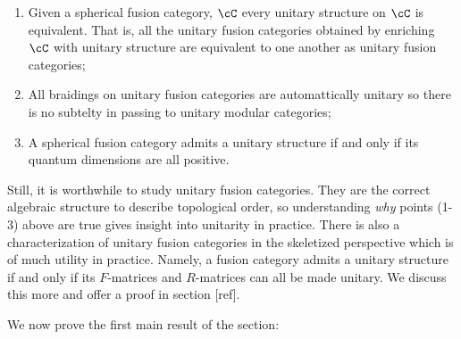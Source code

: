 \begin{enumerate}
\item Given a spherical fusion category, $\cC$ every unitary structure on $\cC$ is equivalent. That is, all the unitary fusion categories obtained by enriching $\cC$ with unitary structure are equivalent to one another as unitary fusion categories;

\item All braidings on unitary fusion categories are automattically unitary so there is no subtelty in passing to unitary modular categories;

\item A spherical fusion category admits a unitary structure if and only if its quantum dimensions are all positive.
\end{enumerate}

Still, it is worthwhile to study unitary fusion categories. They are the correct algebraic structure to describe topological order, so understanding \textit{why} points (1-3) above are true gives insight into unitarity in practice. There is also a characterization of unitary fusion categories in the skeletized perspective which is of much utility in practice. Namely, a fusion category admits a unitary structure if and only if its $F$-matrices and $R$-matrices can all be made unitary. We discuss this more and offer a proof in section [ref].

We now prove the first main result of the section:


